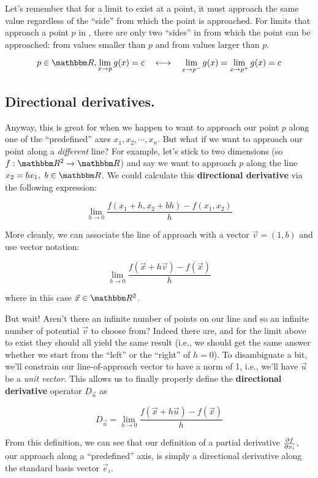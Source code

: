 \documentclass[letterpaper,12pt]{report}
\begin{document}
Let's remember that for a limit to exist at a point, it
must approach the same value regardless of the ``side''
from which the point is approached. For limits that approach
a point \(p\) in , 
there are only two ``sides'' in  from
which the point can be approached: from values smaller
than \(p\) and from values larger than \(p\).

\[p \in \domain{R}, \lim_{x \rightarrow p}g(x) = c 
\quad \longleftrightarrow \quad
\lim_{x \rightarrow p^-}g(x) = \lim_{x \rightarrow p^+}g(x) = c\]

\subsection{Directional derivatives.}

Anyway, this is great for when we happen to want to 
approach our point \(p\) 
along one of the ``predefined'' axes \(x_1, x_2, \cdots, x_n\).
But what if we want to approach our point along a
\emph{different} line? For example, let's stick to two
dimensions (so \(f: \domain{R}^2 \to \domain{R}\)) and say we want to approach \(p\) along the line
\(x_2 = bx_1, \ b \in \domain{R}\). We could calculate this
\textbf{directional derivative} via the following expression:

\[\lim_{h \to 0} \frac{f(x_1 + h, x_2 + bh) - f(x_1,x_2)}{h} \]

More cleanly, we can associate the line of approach with a vector
\(\vec{v} = (1,b)\) and use vector notation:

\[\lim_{h \to 0} \frac{f(\vec{x} + h\vec{v}) - f(\vec{x})}{h} \]

where in this case \(\vec{x} \in \domain{R}^2\).\par
But wait! Aren't there an infinite number of points on our line
and so an infinite number of potential \(\vec{v}\) to choose
from? Indeed there are, and for the limit above to exist
they should all yield the same result (i.e., 
we should get the same answer whether we start
from the ``left'' or the ``right'' of \(h = 0\)). To disambiguate
a bit, we'll constrain our line-of-approach vector to have
a norm of 1, i.e., 
we'll have \(\vec{u}\) be a \emph{unit vector}.
This allows us to finally properly define the 
\textbf{directional derivative} operator \(D_{\vec{u}}\)
as

\[D_{\vec{u}} = \lim_{h \to 0} \frac{f(\vec{x} + h\vec{u}) - f(\vec{x})}{h} \]

From this definition, we can see that our definition of a
partial derivative \(\pdv{f}{x_i}\),
our approach along a ``predefined'' axis, 
is simply a directional
derivative along the standard basis vector \(\vec{e}_i\).\par
\end{document}
